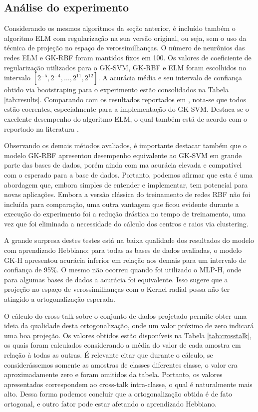 \documentclass[conference]{IEEEtran}
\begin{document}
	\subsection{Análise do experimento}

	Considerando os mesmos algoritmos da seção anterior, é incluído também o algoritmo ELM com regularização na sua versão original, ou seja, sem o uso da técnica de projeção no espaço de verossimilhanças. O número de neurônios das redes ELM e GK-RBF foram mantidos fixos em 100. Os valores de coeficiente de regularização utilizados para o GK-SVM, GK-RBF e ELM foram escolhidos no intervalo $[2^{-5},2^{-4}, \dots, 2^{11},2^{12}]$. A acurácia média e seu intervalo de confiança obtido via bootstraping para o experimento estão consolidados na Tabela \ref{tab:results}. Comparando com os resultados reportados em \cite{menezes2019width}, nota-se que todos estão coerentes, especialmente para a implementação do GK-SVM. Destaca-se o excelente desempenho do algoritmo ELM, o qual também está de acordo com o reportado na literatura \cite{huang2011extreme}.
	
	Observando os demais métodos avaliados, é importante destacar também que o modelo GK-RBF apresentou desempenho equivalente ao GK-SVM em grande parte das bases de dados, porém ainda com ma acurácia elevada e compatível com o esperado para a base de dados. Portanto, podemos afirmar que esta é uma abordagem que, embora simples de entender e implementar, tem potencial para novas aplicações. Embora a versão clássica do treinamento de redes RBF não foi incluída para comparação, uma outra vantagem que ficou evidente durante a execução do experimento foi a redução drástica no tempo de treinamento, uma vez que foi eliminada a necessidade do cálculo dos centros e raios via clustering.  
	
	A grande surpresa destes testes está na baixa qualidade dos resultados do modelo com aprendizado Hebbiano: para todas as bases de dados avaliadas, o modelo GK-H apresentou acurácia inferior em relação aos demais para um intervalo de confiança de 95\%. O mesmo não ocorreu quando foi utilizado o MLP-H, onde para algumas bases de dados a acurácia foi equivalente. Isso sugere que a projeção no espaço de verossimilhanças com o Kernel radial possa não ter atingido a ortogonalização esperada. 
		
	O cálculo do cross-talk sobre o conjunto de dados projetado permite obter uma ideia da qualidade desta ortogonalização, onde um valor próximo de zero indicará uma boa projeção. Os valores obtidos estão disponíveis na Tabela \ref{tab:crosstalk}, os quais foram calculados considerando a média do valor de cada amostra em relação à todas as outras. É relevante citar que durante o cálculo, se considerássemos somente as amostras de classes diferentes classe, o valor era aproximadamente zero e foram omitidos da tabela. Portanto, os valores apresentados correspondem ao cross-talk intra-classe, o qual é naturalmente mais alto. Dessa forma podemos concluir que a ortogonalização obtida é de fato ortogonal, e outro fator pode estar afetando o aprendizado Hebbiano.
		
\end{document}

